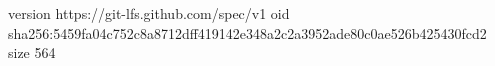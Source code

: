 version https://git-lfs.github.com/spec/v1
oid sha256:5459fa04c752c8a8712dff419142e348a2c2a3952ade80c0ae526b425430fcd2
size 564
